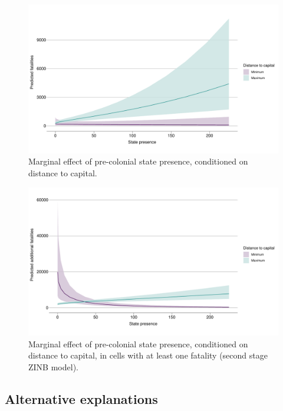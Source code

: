 \begin{figure}[htpb] \centering
	\includegraphics[width=\linewidth]{"../R/Output/deathsInterPlot.pdf"}
	\caption{Marginal effect of pre-colonial state presence, conditioned on
	distance to capital.}
	\label{interdeaths}
\end{figure}

\begin{figure}[htpb]
	\centering
	\includegraphics[width=\linewidth]{"../R/Output/interdeathszinbplot.pdf"}
	\caption{Marginal effect of pre-colonial state presence, conditioned on
	distance to capital, in cells with at least one fatality (second stage
ZINB model).}
	\label{deaths_zinb}
\end{figure}



\subsection{Alternative explanations} \label{Alternative explanations}

